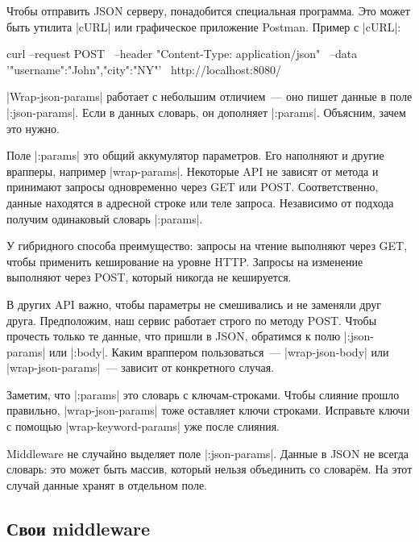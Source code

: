 Чтобы отправить JSON серверу, понадобится специальная программа. Это может быть
утилита \spverb|cURL| или графическое приложение
Postman. Пример с \spverb|cURL|:

\begin{english}
  \begin{bash}
curl --request POST \
     --header "Content-Type: application/json" \
     --data '{"username":"John","city":"NY"}' \
     http://localhost:8080/
  \end{bash}
\end{english}

\spverb|Wrap-json-params| работает с небольшим отличием~--- оно пишет данные в
поле \spverb|:json-params|. Если в данных словарь, он дополняет
\spverb|:params|. Объясним, зачем это нужно.

Поле \spverb|:params| это общий аккумулятор параметров. Его наполняют и другие
врапперы, например \spverb|wrap-params|. Некоторые API не зависят от метода и
принимают запросы одновременно через GET или POST. Соответственно, данные
находятся в адресной строке или теле запроса. Независимо от подхода получим
одинаковый словарь \spverb|:params|.

У гибридного способа преимущество: запросы на чтение выполняют через GET, чтобы
применить кеширование на уровне HTTP. Запросы на изменение выполняют через POST,
который никогда не кешируется.

В других API важно, чтобы параметры не смешивались и не заменяли друг
друга. Предположим, наш сервис работает строго по методу POST. Чтобы прочесть
только те данные, что пришли в JSON, обратимся к полю \spverb|:json-params| или
\spverb|:body|. Каким враппером пользоваться~--- \spverb|wrap-json-body| или
\spverb|wrap-json-params|~--- зависит от конкретного случая.

\index{middleware!wrap-json-params}

Заметим, что \spverb|:params| это словарь с ключам-строками. Чтобы слияние
прошло правильно, \spverb|wrap-json-params| тоже оставляет ключи
строками. Исправьте ключи с помощью \spverb|wrap-keyword-params| уже после
слияния.

Middleware не случайно выделяет поле \spverb|:json-params|. Данные в JSON не
всегда словарь: это может быть массив, который нельзя объединить со
словар\"{е}м. На этот случай данные хранят в отдельном поле.

\subsection{Свои middleware}


